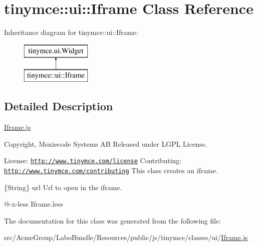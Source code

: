 \hypertarget{classtinymce_1_1ui_1_1_iframe}{\section{tinymce\+:\+:ui\+:\+:Iframe Class Reference}
\label{classtinymce_1_1ui_1_1_iframe}
}
Inheritance diagram for tinymce\+:\+:ui\+:\+:Iframe\+:\begin{figure}[H]
\begin{center}
\leavevmode
\includegraphics[height=2.000000cm]{classtinymce_1_1ui_1_1_iframe}
\end{center}
\end{figure}


\subsection{Detailed Description}
\hyperlink{_iframe_8js}{Iframe.\+js}

Copyright, Moxiecode Systems A\+B Released under L\+G\+P\+L License.

License\+: \href{http://www.tinymce.com/license}{\tt http\+://www.\+tinymce.\+com/license} Contributing\+: \href{http://www.tinymce.com/contributing}{\tt http\+://www.\+tinymce.\+com/contributing} This class creates an iframe.

\{String\} url Url to open in the iframe.

@-\/x-\/less Iframe.\+less 

The documentation for this class was generated from the following file\+:\begin{DoxyCompactItemize}
\item 
src/\+Acme\+Group/\+Labo\+Bundle/\+Resources/public/js/tinymce/classes/ui/\hyperlink{_iframe_8js}{Iframe.\+js}\end{DoxyCompactItemize}
